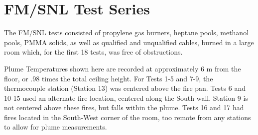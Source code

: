 \newpage

\section{FM/SNL Test Series}

\label{FM/SNL_Plume}

The FM/SNL tests consisted of propylene gas burners, heptane pools, methanol pools, PMMA solids, as well as qualified and unqualified cables, burned in a large room which, for the first 18 tests, was free of obstructions.

Plume Temperatures shown here are recorded at approximately 6 m from the floor, or .98 times the total ceiling height. For Tests 1-5 and 7-9, the thermocouple station (Station 13) was centered above the fire pan. Tests 6 and 10-15 used an alternate fire location, centered along the South wall. Station 9 is not centered above these fires, but falls within the plume. Tests 16 and 17 had fires located in the South-West corner of the room, too remote from any stations to allow for plume measurements.

